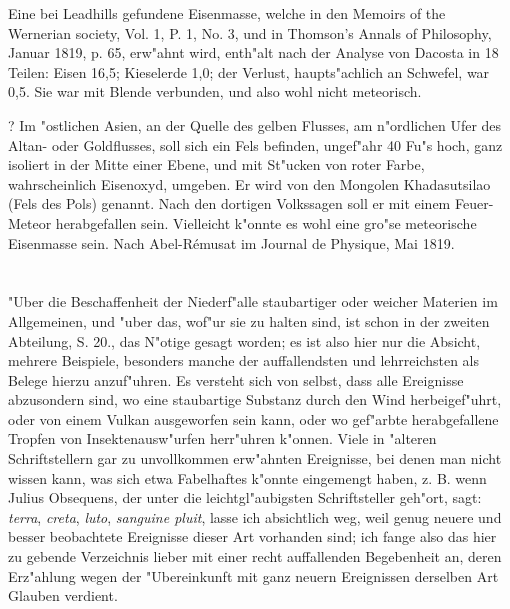 \documentclass[a4paper, 11pt, oneside, polutonikogreek, german]{article}
\begin{document}
Eine bei Leadhills gefundene Eisenmasse, welche in den Memoirs of the Wernerian society, Vol. 1, P. 1, No. 3, und in Thomson's Annals of Philosophy, Januar 1819, p. 65, erw"ahnt wird, enth"alt nach der Analyse von Dacosta in 18 Teilen: Eisen 16,5; Kieselerde 1,0; der Verlust, haupts"achlich an Schwefel, war 0,5. Sie war mit Blende verbunden, und also wohl nicht meteorisch.

? Im "ostlichen Asien, an der Quelle des gelben Flusses, am n"ordlichen Ufer des Altan- oder Goldflusses, soll sich ein Fels befinden, ungef"ahr 40 Fu"s hoch, ganz isoliert in der Mitte einer Ebene, und mit St"ucken von roter Farbe, wahrscheinlich Eisenoxyd, umgeben. Er wird von den Mongolen Khadasutsilao (Fels des Pols) genannt. Nach den dortigen Volkssagen soll er mit einem Feuer-Meteor herabgefallen sein. Vielleicht k"onnte es wohl eine gro"se meteorische Eisenmasse sein. Nach Abel-Rémusat im Journal de Physique, Mai 1819.
\clearpage
\section{}
\paragraph{}
"Uber die Beschaffenheit der Niederf"alle staubartiger oder weicher Materien im Allgemeinen, und "uber das, wof"ur sie zu halten sind, ist schon in der zweiten Abteilung, S. 20., das N"otige gesagt worden; es ist also hier nur die Absicht, mehrere Beispiele, besonders manche der auffallendsten und lehrreichsten als Belege hierzu anzuf"uhren. Es versteht sich von selbst, dass alle Ereignisse abzusondern sind, wo eine staubartige Substanz durch den Wind herbeigef"uhrt, oder von einem Vulkan ausgeworfen sein kann, oder wo gef"arbte herabgefallene Tropfen von Insektenausw"urfen herr"uhren k"onnen. Viele in "alteren Schriftstellern gar zu unvollkommen erw"ahnten Ereignisse, bei denen man nicht wissen kann, was sich etwa Fabelhaftes k"onnte eingemengt haben, z. B. wenn Julius Obsequens, der unter die leichtgl"aubigsten Schriftsteller geh"ort, sagt: \emph{terra}, \emph{creta}, \emph{luto}, \emph{sanguine pluit}, lasse ich absichtlich weg, weil genug neuere und besser beobachtete Ereignisse dieser Art vorhanden sind; ich fange also das hier zu gebende Verzeichnis lieber mit einer recht auffallenden Begebenheit an, deren Erz"ahlung wegen der "Ubereinkunft mit ganz neuern Ereignissen derselben Art Glauben verdient.
\end{document}
